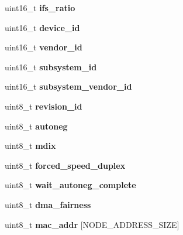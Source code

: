 \begin{DoxyCompactItemize}
uint16\+\_\+t {\bfseries ifs\+\_\+ratio}
\item 
\mbox{\label{structem__hw_aafa1bea9f37a97066ed5588ce3030ec1}} 
uint16\+\_\+t {\bfseries device\+\_\+id}
\item 
\mbox{\label{structem__hw_a715d77ed540bffadcbe9573838fc9b7c}} 
uint16\+\_\+t {\bfseries vendor\+\_\+id}
\item 
\mbox{\label{structem__hw_ad7e9b4f1f515131929e14e20afd5d524}} 
uint16\+\_\+t {\bfseries subsystem\+\_\+id}
\item 
\mbox{\label{structem__hw_a4ded87a2ad77c398963aaaaf525be760}} 
uint16\+\_\+t {\bfseries subsystem\+\_\+vendor\+\_\+id}
\item 
\mbox{\label{structem__hw_a8fc28c12906255535247b2dc7d2c7be4}} 
uint8\+\_\+t {\bfseries revision\+\_\+id}
\item 
\mbox{\label{structem__hw_ad342eb5668b87ca12e0df92d62563b81}} 
uint8\+\_\+t {\bfseries autoneg}
\item 
\mbox{\label{structem__hw_a80a54c9e2804b7806ec0dd6454d396a6}} 
uint8\+\_\+t {\bfseries mdix}
\item 
\mbox{\label{structem__hw_a7a036ef8bc07c7cc8233e4554cba0f74}} 
uint8\+\_\+t {\bfseries forced\+\_\+speed\+\_\+duplex}
\item 
\mbox{\label{structem__hw_a188378e44a4cfb3e3ee3face62073b4a}} 
uint8\+\_\+t {\bfseries wait\+\_\+autoneg\+\_\+complete}
\item 
\mbox{\label{structem__hw_ab2ef6a9fbaf9d7b2a72698441752afbc}} 
uint8\+\_\+t {\bfseries dma\+\_\+fairness}
\item 
\mbox{\label{structem__hw_a1f1fc4049365f080121c37891c64b233}} 
uint8\+\_\+t {\bfseries mac\+\_\+addr} \mbox{[}N\+O\+D\+E\+\_\+\+A\+D\+D\+R\+E\+S\+S\+\_\+\+S\+I\+ZE\mbox{]}
\item 
\mbox{\label{structem__hw_a78db53d9505394f73f1f9015c1fd179d}} 

\end{DoxyCompactItemize}
